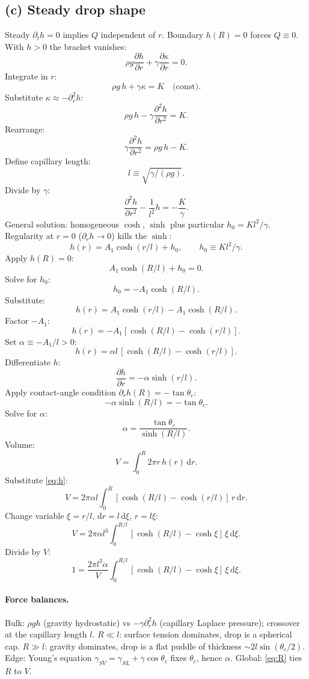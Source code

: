 \documentclass[11pt]{article}
\newcommand{\de}{\mathrm{d}}
\newcommand{\pd}[2]{\frac{\partial #1}{\partial #2}}
\newcommand{\pdd}[2]{\frac{\partial^{2} #1}{\partial #2^{2}}}
\begin{document}
\subsection*{(c) Steady drop shape}

Steady $\partial_t h=0$ implies $Q$ independent of $r$. Boundary $h(R)=0$ forces $Q\equiv 0$. With $h>0$ the bracket vanishes:
\[ \rho g\pd{h}{r} + \gamma\pd{\kappa}{r} = 0. \]
Integrate in $r$:
\[ \rho g\,h + \gamma\kappa = K\quad\text{(const)}. \]
Substitute $\kappa\approx -\partial_r^{2}h$:
\[ \rho g\,h - \gamma\pdd{h}{r} = K. \]
Rearrange:
\[ \gamma\pdd{h}{r} = \rho g\,h - K. \]
Define capillary length:
\[ \boxed{\;l\equiv\sqrt{\gamma/(\rho g)}.\;} \]
Divide by $\gamma$:
\[ \pdd{h}{r} - \frac{1}{l^{2}}h = -\frac{K}{\gamma}. \]
General solution: homogeneous $\cosh$, $\sinh$ plus particular $h_0 = Kl^{2}/\gamma$. Regularity at $r=0$ ($\partial_r h\to 0$) kills the $\sinh$:
\[ h(r) = A_1\cosh(r/l) + h_0,\qquad h_0\equiv Kl^{2}/\gamma. \]
Apply $h(R)=0$:
\[ A_1\cosh(R/l) + h_0 = 0. \]
Solve for $h_0$:
\[ h_0 = -A_1\cosh(R/l). \]
Substitute:
\[ h(r) = A_1\cosh(r/l) - A_1\cosh(R/l). \]
Factor $-A_1$:
\[ h(r) = -A_1[\cosh(R/l) - \cosh(r/l)]. \]
Set $\alpha\equiv -A_1/l>0$:
\begin{equation}
\boxed{\;h(r) = \alpha l\,[\cosh(R/l) - \cosh(r/l)].\;}
\label{eq:h}
\end{equation}
Differentiate $h$:
\[ \pd{h}{r} = -\alpha\sinh(r/l). \]
Apply contact-angle condition $\partial_r h(R)=-\tan\theta_c$:
\[ -\alpha\sinh(R/l) = -\tan\theta_c. \]
Solve for $\alpha$:
\[ \boxed{\;\alpha = \frac{\tan\theta_c}{\sinh(R/l)}.\;} \]
Volume:
\[ V = \int_{0}^{R}2\pi r\,h(r)\,\de r. \]
Substitute \eqref{eq:h}:
\[ V = 2\pi\alpha l\int_{0}^{R}[\cosh(R/l)-\cosh(r/l)]\,r\,\de r. \]
Change variable $\xi=r/l$, $\de r = l\,\de\xi$, $r=l\xi$:
\[ V = 2\pi\alpha l^{3}\int_{0}^{R/l}[\cosh(R/l)-\cosh\xi]\,\xi\,\de\xi. \]
Divide by $V$:
\begin{equation}
\boxed{\;1 = \frac{2\pi l^{3}\alpha}{V}\int_{0}^{R/l}[\cosh(R/l)-\cosh\xi]\,\xi\,\de\xi.\;}
\label{eq:R}
\end{equation}

\paragraph{Force balances.}
Bulk: $\rho g h$ (gravity hydrostatic) vs $-\gamma\partial_r^{2}h$ (capillary Laplace pressure); crossover at the capillary length $l$. $R\ll l$: surface tension dominates, drop is a spherical cap. $R\gg l$: gravity dominates, drop is a flat puddle of thickness $\sim 2l\sin(\theta_c/2)$.
Edge: Young's equation $\gamma_{SV}=\gamma_{SL}+\gamma\cos\theta_c$ fixes $\theta_c$, hence $\alpha$.
Global: \eqref{eq:R} ties $R$ to $V$.
\end{document}
